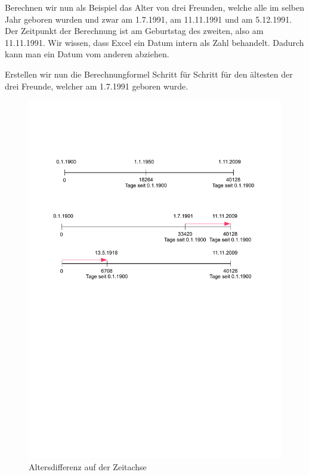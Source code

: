 Berechnen wir nun als Beispiel das Alter von drei Freunden, welche alle im selben Jahr geboren wurden und zwar am 1.7.1991, am 11.11.1991 und am 5.12.1991. Der Zeitpunkt der Berechnung ist am Geburtstag des zweiten, also am
11.11.1991. Wir wissen, dass Excel ein Datum intern als Zahl behandelt. Dadurch kann man ein Datum vom anderen abziehen.

Erstellen wir nun die Berechnungformel Schritt für Schritt für den ältesten der drei Freunde, welcher am 1.7.1991 geboren wurde.
	\begin{figure}[H]
		\centering
		\includegraphics{_OpenOffice/datum2.pdf}
		\caption{Altersdifferenz auf der Zeitachse}
		\label{fig:datum2}

	\end{figure}


